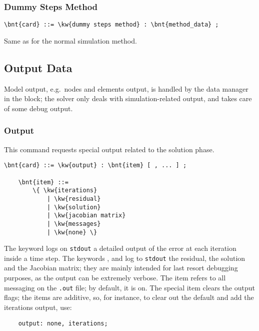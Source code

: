 \subsubsection{Dummy Steps Method}
\begin{Verbatim}[commandchars=\\\{\}]
    \bnt{card} ::= \kw{dummy steps method} : \bnt{method_data} ;
\end{Verbatim}
Same as for the normal simulation method. 

\subsection{Output Data}\label{sec:PROBLEMS:OUTPUT}
Model output, e.g.\ nodes and elements output, is handled
by the data manager in the  block;
the solver only deals with simulation-related output,
and takes care of some debug output.

\subsubsection{Output}
This command requests special output related to the solution phase.
\begin{Verbatim}[commandchars=\\\{\}]
    \bnt{card} ::= \kw{output} : \bnt{item} [ , ... ] ;

    \bnt{item} ::=
        \{ \kw{iterations}
            | \kw{residual}
            | \kw{solution}
            | \kw{jacobian matrix}
            | \kw{messages}
            | \kw{none} \}
\end{Verbatim}
The keyword  logs on \texttt{stdout}
a detailed output of the error at each iteration inside a time step.
The keywords ,  and 
log to \texttt{stdout} the residual, the solution and the Jacobian matrix;
they are mainly intended for last resort debugging purposes,
as the output can be extremely verbose.
The item  refers to all messaging on the \texttt{.out} file;
by default, it is on.
The special item  clears the output flags; the items
are additive, so, for instance, to clear out the default 
and add the iterations output, use:
\begin{verbatim}
    output: none, iterations;
\end{verbatim}

